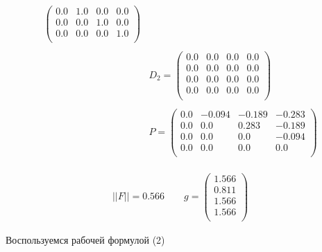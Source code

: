 \documentclass[letterpaper, 11pt]{extarticle}
\begin{document}
\begin{align*}
\begin{aligned}
\begin{pmatrix}
            0.0 & 1.0 & 0.0 & 0.0 \\
            0.0 & 0.0 & 1.0 & 0.0 \\
            0.0 & 0.0 & 0.0 & 1.0 \\
        \end{pmatrix}\\\\
        & D_2 = \begin{pmatrix}
            0.0 & 0.0 & 0.0 & 0.0 \\
            0.0 & 0.0 & 0.0 & 0.0 \\
            0.0 & 0.0 & 0.0 & 0.0 \\
            0.0 & 0.0 & 0.0 & 0.0 \\
        \end{pmatrix}\\\\
        & P = \begin{pmatrix}
            0.0 & -0.094 & -0.189 & -0.283 \\
            0.0 & 0.0 & 0.283 & -0.189 \\
            0.0 & 0.0 & 0.0 & -0.094 \\
            0.0 & 0.0 & 0.0 & 0.0 \\
        \end{pmatrix}
    \end{aligned}
\end{align*}

\begin{align*}
    ||F|| = 0.566 \qquad
    g = \begin{pmatrix}
        1.566 \\
        0.811 \\
        1.566 \\
        1.566 \\
    \end{pmatrix}
\end{align*}

\noindent Воспользуемся рабочей формулой (2)
\end{document}
